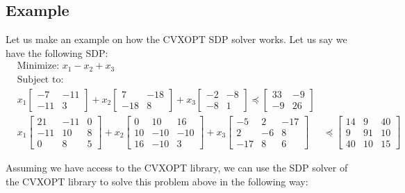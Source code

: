 \subsection{Example}
\label{sdpexample}
Let us make an example on how the CVXOPT SDP solver works. Let us say we have the following SDP:
\begin{align*}
&\text{Minimize: }  x_1 - x_2 + x_3 \\
&\text{Subject to: } \nonumber\\
 &x_1\left[\begin{matrix} -7 & -11  \\ -11 & 3  \end{matrix}\right]  + 
  x_2\left[\begin{matrix} 7 & -18  \\ -18 & 8  \end{matrix}\right]  +
   x_3\left[\begin{matrix} -2 & -8  \\ -8 & 1  \end{matrix}\right]    \preceq   \left[\begin{matrix} 33 & -9  \\ -9 & 26  \end{matrix}\right] \\ 
&x_1\left[\begin{matrix} 21  & -11 &   0 \\  -11 &  10 &   8 \\   0 &   8 & 5 \end{matrix}\right]   +  x_2\left[\begin{matrix}  0  &  10  &  16  \\  10  & -10  & -10\\  16  & -10  & 3 \end{matrix}\right]  + 
x_3\left[\begin{matrix}  -5  &   2  & -17 \\   2  &  -6  &   8 \\ -17  &  8  & 6 \end{matrix}\right]   &\preceq   \left[\begin{matrix} 14  & 9  & 40 \\ 9  & 91  & 10 \\ 40  & 10  & 15 \end{matrix}\right] 
\end{align*}

Assuming we have access to the CVXOPT library, we can use the SDP solver of the CVXOPT library to solve this problem above in the following way:

